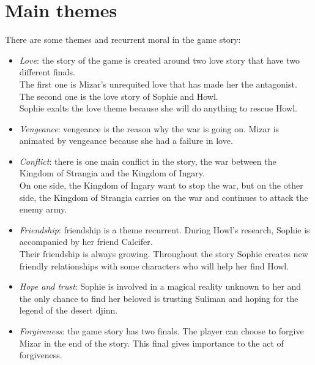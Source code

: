 \section{Main themes}

There are some themes and recurrent moral in the game story:
\begin{itemize}
\item \textit{Love}: the story of the game is created around two love story that have two different finals.\\
  The first one is Mizar’s unrequited love that has made her the antagonist. \\
  The second one is the love story of Sophie and Howl. \\
  Sophie exalts the love theme because she will do anything to rescue Howl.
  
\item \textit{Vengeance}: vengeance is the reason why the war is going on. Mizar is animated by vengeance because she had a failure in love.
  
\item \textit{Conflict}: there is one main conflict in the story, the war between the Kingdom of Strangia and the Kingdom of Ingary. \\
  On one side, the Kingdom of Ingary want to stop the war, but on the other side, the Kingdom of Strangia carries on the war and continues to attack the enemy army.
  
\item \textit{Friendship}: friendship is a theme recurrent. During Howl's research, Sophie is accompanied by her friend Calcifer. \\
  Their friendship is always growing. Throughout the story Sophie creates new friendly relationships with some characters who will help her find Howl.

\item \textit{Hope and trust}: Sophie is involved in a magical reality unknown to her and the only chance to find her beloved is trusting Suliman and hoping for the legend of the desert djinn.
  
\item \textit{Forgiveness}: the game story has two finals. The player can choose to forgive Mizar in the end of the story. This final gives importance to the act of forgiveness.

\end{itemize}
